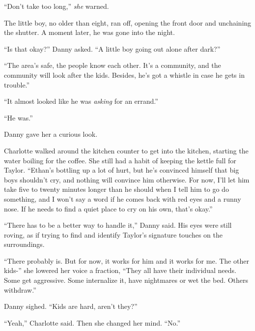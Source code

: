 ``Don't take too long,'' \emph{she} warned.



The little boy, no older than eight, ran off, opening the front door and unchaining the shutter.  A moment later, he was gone into the night.



``Is that okay?'' Danny asked.  ``A little boy going out alone after dark?''



``The area's safe, the people know each other.  It's a community, and the community will look after the kids.  Besides, he's got a whistle in case he gets in trouble.''



``It almost looked like he was \emph{asking} for an errand.''



``He was.''



Danny gave her a curious look.



Charlotte walked around the kitchen counter to get into the kitchen, starting the water boiling for the coffee.  She still had a habit of keeping the kettle full for Taylor.  ``Ethan's bottling up a lot of hurt, but he's convinced himself that big boys shouldn't cry, and nothing will convince him otherwise.  For now, I'll let him take five to twenty minutes longer than he should when I tell him to go do something, and I won't say a word if he comes back with red eyes and a runny nose.  If he needs to find a quiet place to cry on his own, that's okay.''



``There has to be a better way to handle it,'' Danny said.  His eyes were still roving, as if trying to find and identify Taylor's signature touches on the surroundings.



``There probably is.  But for now, it works for him and it works for me.  The other kids-'' she lowered her voice a fraction, ``They all have their individual needs.  Some get aggressive.  Some internalize it, have nightmares or wet the bed.  Others withdraw.''



Danny sighed.  ``Kids are hard, aren't they?''



``Yeah,'' Charlotte said.  Then she changed her mind.  ``No.''



